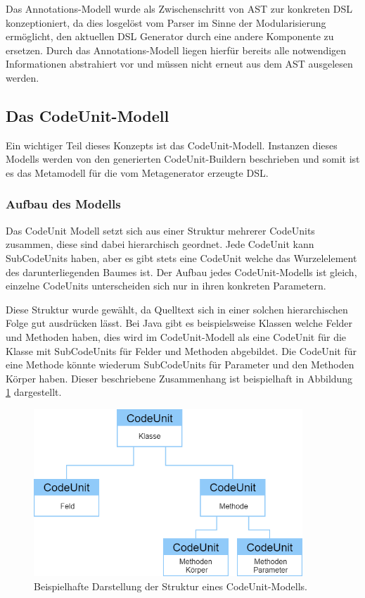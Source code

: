 \documentclass[12pt,oneside,a4paper,parskip]{scrbook}
\begin{document}
Das Annotations-Modell wurde als Zwischenschritt von AST zur konkreten DSL konzeptioniert, da dies losgelöst vom Parser im Sinne der Modularisierung ermöglicht, den aktuellen DSL Generator durch eine andere Komponente zu ersetzen. Durch das Annotations-Modell liegen hierfür bereits alle notwendigen Informationen abstrahiert vor und müssen nicht erneut aus dem AST ausgelesen werden.

\subsection{Das CodeUnit-Modell}

Ein wichtiger Teil dieses Konzepts ist das CodeUnit-Modell. Instanzen dieses Modells werden von den generierten CodeUnit-Buildern beschrieben und somit ist es das Metamodell für die vom Metagenerator erzeugte DSL.

\subsubsection{Aufbau des Modells}

Das CodeUnit Modell setzt sich aus einer Struktur mehrerer CodeUnits zusammen, diese sind dabei hierarchisch geordnet. Jede CodeUnit kann SubCodeUnits haben, aber es gibt stets eine CodeUnit welche das Wurzelelement des darunterliegenden Baumes ist. Der Aufbau jedes CodeUnit-Modells ist gleich, einzelne CodeUnits unterscheiden sich nur in ihren konkreten Parametern.

Diese Struktur wurde gewählt, da Quelltext sich in einer solchen hierarchischen Folge gut ausdrücken lässt. Bei Java gibt es beispielsweise Klassen welche Felder und Methoden haben, dies wird im CodeUnit-Modell als eine CodeUnit für die Klasse mit SubCodeUnits für Felder und Methoden abgebildet. Die CodeUnit für eine Methode könnte wiederum SubCodeUnits für Parameter und den Methoden Körper haben. Dieser beschriebene Zusammenhang ist beispielhaft in Abbildung \ref{fig:cu1} dargestellt.

\begin{figure}[htbp]
	\centering
	\includegraphics[width=0.9\textwidth]{bilder/cuModelBsp}
	\caption{Beispielhafte Darstellung der Struktur eines CodeUnit-Modells.}
	\label{fig:cu1}
\end{figure}
\end{document}
